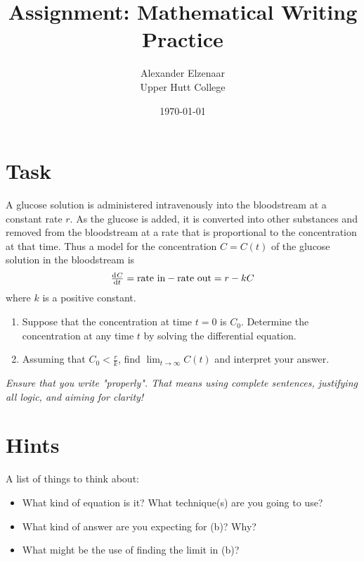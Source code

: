 \documentclass[a4paper]{article}
\author{Alexander Elzenaar\\Upper Hutt College}
\date{\today}
\title{Assignment: Mathematical Writing Practice}
\begin{document}
\maketitle

\section{Task}
A glucose solution is administered intravenously into the bloodstream at a constant
rate $ r $. As the glucose is added, it is converted into other substances and removed
from the bloodstream at a rate that is proportional to the concentration at that time. Thus
a model for the concentration $ C = C(t) $ of the glucose solution in the bloodstream is
\begin{equation}
    \od{C}{t} = \text{rate in} - \text{rate out} = r - kC
\end{equation}
where $ k $ is a positive constant.

\begin{enumerate}[label=(\alph*)]
  \item Suppose that the concentration at time $ t = 0 $ is $ C_0 $. Determine the
        concentration at any time $ t $ by solving the differential equation.
  \item Assuming that $ C_0 < \frac{r}{k} $, find $ \lim_{t\to\infty} C(t) $ and
        interpret your answer.
\end{enumerate}

\textit{Ensure that you write "properly". That means using complete sentences, justifying
all logic, and aiming for clarity!}

\section{Hints}
A list of things to think about:
\begin{itemize}
  \item What kind of equation is it? What technique(s) are you going to use?
  \item What kind of answer are you expecting for (b)? Why?
  \item What might be the use of finding the limit in (b)?
\end{itemize}

\newpage
\end{document}
